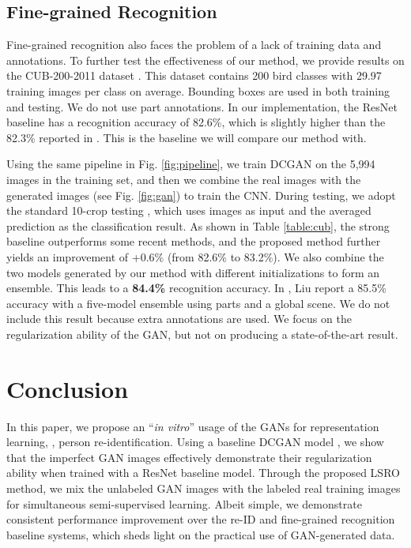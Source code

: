 \documentclass[10pt,twocolumn,letterpaper]{article}
\begin{document}
\subsection{Fine-grained Recognition}
Fine-grained recognition also faces the problem of a lack of training data and annotations. To further test the effectiveness of our method, we provide results on the CUB-200-2011 dataset \cite{WahCUB_200_2011}. This dataset contains 200 bird classes with 29.97 training images per class on average. Bounding boxes are used in both training and testing. We do not use part annotations.
In our implementation, the ResNet baseline has a recognition accuracy of 82.6\%, which is slightly higher than the 82.3\% reported in \cite{liu2016localizing}. This is the baseline we will compare our method with.

Using the same pipeline in Fig. \ref{fig:pipeline}, we train DCGAN on the 5,994 images in the training set, and then we combine the real images with the generated images (see Fig. \ref{fig:gan}) to train the CNN. During testing, we adopt the standard 10-crop testing \cite{krizhevsky2012imagenet}, which uses  images as input and the averaged prediction as the classification result. As shown in Table \ref{table:cub}, the strong baseline outperforms some recent methods, and the proposed method further yields an improvement of +0.6\% (from 82.6\% to 83.2\%).
We also combine the two models generated by our method with different initializations to form an ensemble. This leads to a \textbf{84.4\%} recognition accuracy. In \cite{liu2016localizing}, Liu \etal report a 85.5\% accuracy with a five-model ensemble using parts and a global scene. We do not include this result because extra annotations are used. We focus on the regularization ability of the GAN, but not on producing a state-of-the-art result.

\section{Conclusion}
In this paper, we propose an ``\emph{in vitro}'' usage of the GANs for representation learning, \ie, person re-identification. Using a baseline DCGAN model \cite{radford2015unsupervised}, we show that the imperfect GAN images effectively demonstrate their regularization ability when trained with a ResNet baseline model. Through the proposed LSRO method, we mix the unlabeled GAN images with the labeled real training images for simultaneous semi-supervised learning. Albeit simple, we demonstrate consistent performance improvement over the re-ID and fine-grained recognition baseline systems, which sheds light on the practical use of GAN-generated data. 
\end{document}
